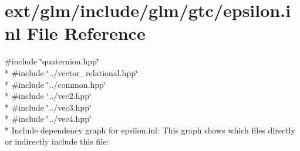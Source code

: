 \hypertarget{epsilon_8inl}{\section{ext/glm/include/glm/gtc/epsilon.inl File Reference}
\label{epsilon_8inl}
}
{\ttfamily \#include \char`\"{}quaternion.\-hpp\char`\"{}}\\*
{\ttfamily \#include \char`\"{}../vector\-\_\-relational.\-hpp\char`\"{}}\\*
{\ttfamily \#include \char`\"{}../common.\-hpp\char`\"{}}\\*
{\ttfamily \#include \char`\"{}../vec2.\-hpp\char`\"{}}\\*
{\ttfamily \#include \char`\"{}../vec3.\-hpp\char`\"{}}\\*
{\ttfamily \#include \char`\"{}../vec4.\-hpp\char`\"{}}\\*
Include dependency graph for epsilon.\-inl\-:
This graph shows which files directly or indirectly include this file\-:
